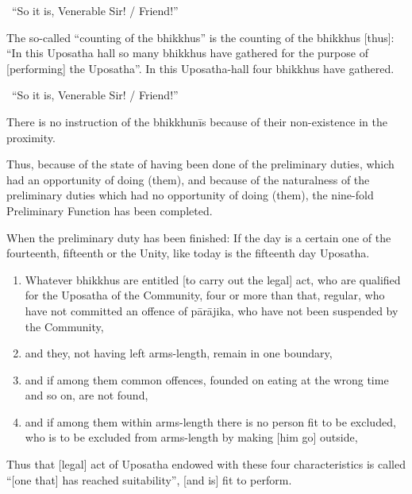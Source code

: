 \begin{center}
  \anglebracketleft\ \hspace{-0.5mm}``So it is, Venerable Sir! / Friend!'' \hspace{-0.5mm}\anglebracketright\
\end{center}

The so-called ``counting of the bhikkhus'' is the counting of the bhikkhus [thus]: ``In this Uposatha hall so many bhikkhus have gathered for the purpose of [performing] the Uposatha''. In this Uposatha-hall four bhikkhus have gathered.

\begin{center}
  \anglebracketleft\ \hspace{-0.5mm}``So it is, Venerable Sir! / Friend!'' \hspace{-0.5mm}\anglebracketright\
\end{center}

There is no instruction of the bhikkhunīs because of their non-existence in the proximity.

Thus, because of the state of having been done of the preliminary duties, which had an opportunity of doing (them), and because of the naturalness of the preliminary duties which had no opportunity of doing (them), the nine-fold Preliminary Function has been completed.

When the preliminary duty has been finished: If the day is a certain one of the fourteenth, fifteenth or the Unity, like today is the fifteenth day Uposatha.

\begin{enumerate}
  \item Whatever bhikkhus are entitled [to carry out the legal] act, who are qualified for the Uposatha of the Community, four or more than that, regular, who have not committed an offence of pārājika, who have not been suspended by the Community,
  \item and they, not having left arms-length, remain in one boundary,
  \item and if among them common offences, founded on eating at the wrong time and so on, are not found,
  \item and if among them within arms-length there is no person fit to be excluded, who is to be excluded from arms-length by making [him go] outside,
\end{enumerate}

Thus that [legal] act of Uposatha endowed with these four characteristics is called ``[one that] has reached suitability'', [and is] fit to perform.

